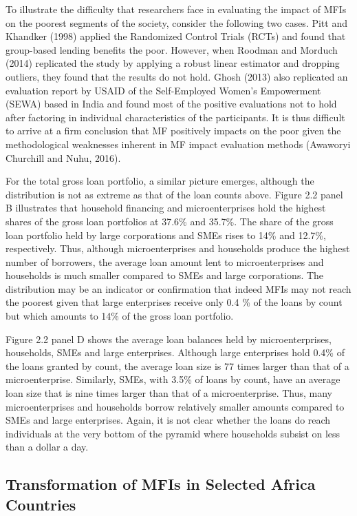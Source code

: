 \documentclass[a4paper, nobind]{templates/ociamthesis}
\begin{document}
To illustrate the difficulty that researchers face in evaluating the impact of MFIs on the poorest segments of the society, consider the following two cases. Pitt and Khandker (1998) applied the Randomized Control Trials (RCTs) and found that group-based lending benefits the poor. However, when Roodman and Morduch (2014) replicated the study by applying a robust linear estimator and dropping outliers, they found that the results do not hold. Ghosh (2013) also replicated an evaluation report by USAID of the Self-Employed Women's Empowerment (SEWA) based in India and found most of the positive evaluations not to hold after factoring in individual characteristics of the participants. It is thus difficult to arrive at a firm conclusion that MF positively impacts on the poor given the methodological weaknesses inherent in MF impact evaluation methods (Awaworyi Churchill and Nuhu, 2016).

For the total gross loan portfolio, a similar picture emerges, although the distribution is not as extreme as that of the loan counts above. Figure 2.2 panel B illustrates that household financing and microenterprises hold the highest shares of the gross loan portfolios at 37.6\% and 35.7\%. The share of the gross loan portfolio held by large corporations and SMEs rises to 14\% and 12.7\%, respectively. Thus, although microenterprises and households produce the highest number of borrowers, the average loan amount lent to microenterprises and households is much smaller compared to SMEs and large corporations. The distribution may be an indicator or confirmation that indeed MFIs may not reach the poorest given that large enterprises receive only 0.4 \% of the loans by count but which amounts to 14\% of the gross loan portfolio.

Figure 2.2 panel D shows the average loan balances held by microenterprises, households, SMEs and large enterprises. Although large enterprises hold 0.4\% of the loans granted by count, the average loan size is 77 times larger than that of a microenterprise.
Similarly, SMEs, with 3.5\% of loans by count, have an average loan size that is nine times larger than that of a microenterprise. Thus, many microenterprises and households borrow relatively smaller amounts compared to SMEs and large enterprises. Again, it is not clear whether the loans do reach individuals at the very bottom of the pyramid where households subsist on less than a dollar a day.

\hypertarget{transformation-of-mfis-in-selected-africa-countries}{%
\subsection{Transformation of MFIs in Selected Africa Countries}\label{transformation-of-mfis-in-selected-africa-countries}}
\end{document}

